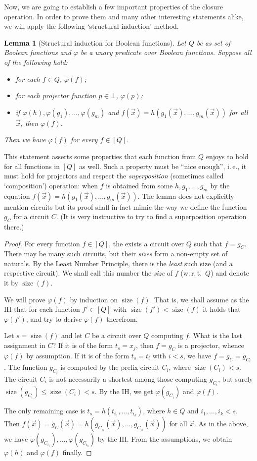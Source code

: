 \documentclass[12pt,notitlepage]{article}
\theoremstyle{plain}
\newtheorem{lemma}[thm]{Lemma}
\theoremstyle{definition}
\theoremstyle{plain}
\renewcommand{\phi}{\varphi}
\newcommand{\1}{\mathbf{1}}
\newcommand{\0}{\mathbf{0}}
\DeclareMathOperator{\sz}{\mathrm size}
\begin{document}
Now, we are going to establish a few important properties of the closure operation. In order to prove them and many other interesting statements alike, we will apply the following `structural induction' method.
\begin{lemma}[Structural induction for Boolean functions]\label{bool:struct}
Let $Q$ be as set of Boolean functions and $\phi$ be a unary predicate over Boolean functions. Suppose all of the following hold:
\begin{itemize}
\item for each $f \in Q$, $\phi(f)$;
\item for each projector function $p \in \bot$, $\phi(p)$;
\item if $\phi(h), \phi(g_1), \ldots, \phi(g_m)$ and $f(\vec x) = h(g_1(\vec x),\ldots, g_m(\vec x))$ for all $\vec x$, then $\phi(f)$.
\end{itemize}
Then we have $\phi(f)$ for every $f \in [Q]$.
\end{lemma}
This statement asserts some properties that each function from $Q$ enjoys to hold for all functions in $[Q]$ as well. Such a property must be ``nice enough'', i.\,e., it must hold for projectors and respect the \emph{superposition} (sometimes called `composition') operation: when $f$ is obtained from some $h, g_1, \ldots, g_m$ by the equation $f(\vec x) = h(g_1(\vec x),\ldots, g_m(\vec x))$. The lemma does not explicitly mention circuits but its proof shall in fact mimic the way we define the function $g_C$ for a circuit $C$. (It is very instructive to try to find a superposition operation there.)
\begin{proof}
For every function $f \in [Q]$, the exists a circuit over $Q$ such that $f = g_C$. There may be many such circuits, but their \emph{sizes} form a non-empty set of naturals. By the Least Number Principle, there is the \emph{least} such size (and a respective circuit). We shall call this number the \emph{size} of $f$ (w.\,r.\,t.\ $Q$) and denote it by $\sz(f)$.

We will prove $\phi(f)$ by induction on $\sz(f)$. That is, we shall assume as the IH that for each function $f' \in [Q]$ with $\sz(f') < \sz(f)$ it holds that $\phi(f')$, and try to derive $\phi(f)$ therefrom.

Let $s = \sz(f)$ and let $C$ be a circuit over $Q$ computing $f$. What is the last assignment in $C$? If it is of the form $t_s = x_j$, then $f = g_C$ is a projector, whence $\phi(f)$ by assumption. If it is of the form $t_s = t_i$ with $i < s$, we have $f = g_C = g_{C_i}$. The function $g_{C_i}$ is computed by the prefix circuit $C_i$, where $\sz(C_i) < s$.  The circuit $C_i$ is not necessarily a shortest among those computing $g_{C_i}$, but surely $\sz(g_{C_i}) \leq \sz(C_i) < s$. By the IH, we get $\phi(g_{C_i})$ and $\phi(f)$.

The only remaining case is $t_s = h(t_{i_1},\ldots, t_{i_k})$, where $h \in Q$ and $i_1, \ldots, i_k < s$. Then $f(\vec x) = g_C(\vec x) = h(g_{C_{i_1}}(\vec x), \ldots, g_{C_{i_k}}(\vec x))$ for all $\vec x$. As in the above, we have $\phi(g_{C_{i_1}}), \ldots, \phi(g_{C_{i_k}})$ by the IH. From the assumptions, we obtain $\phi(h)$ and $\phi(f)$ finally.
\end{proof}
\end{document}
